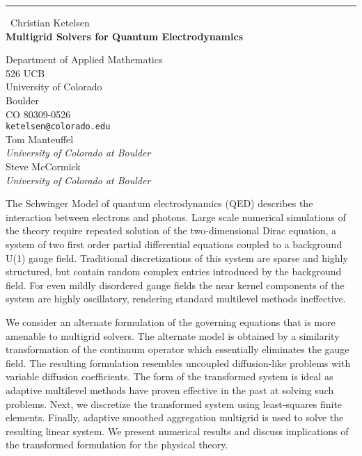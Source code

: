 \documentclass{report}
\begin{document}
\begin{center}
\rule{6in}{1pt} \
{\large Christian Ketelsen \\
{\bf Multigrid Solvers for Quantum Electrodynamics}}

Department of Applied Mathematics \\ 526 UCB \\ University of Colorado \\ Boulder \\ CO 80309-0526
\\
{\tt ketelsen@colorado.edu}\\
Tom Manteuffel \\
{\em University of Colorado at Boulder}\\
Steve McCormick\\
{\em University of Colorado at Boulder}\end{center}

The Schwinger Model of quantum electrodynamics (QED) describes the
interaction between electrons and photons. Large scale numerical
simulations of the theory require repeated solution of the
two-dimensional Dirac equation, a system of two first order partial
differential equations coupled to a background U(1) gauge field.
Traditional discretizations of this system are sparse and highly
structured, but contain random complex entries introduced by the
background field. For even mildly disordered gauge fields the near kernel
components of the system are highly oscillatory, rendering standard
multilevel methods ineffective.

We consider an alternate formulation of the governing equations that is
more amenable to multigrid solvers. The alternate model is obtained by a
similarity transformation of the continuum operator which essentially
eliminates the gauge field. The resulting formulation resembles uncoupled
diffusion-like problems with variable diffusion coefficients. The form of
the transformed system is ideal as adaptive multilevel methods have
proven effective in the past at solving such problems. Next, we
discretize the transformed system using least-squares finite elements.
Finally, adaptive smoothed aggregation multigrid is used to solve the
resulting linear system. We present numerical results and discuss
implications of the transformed formulation for the physical theory.
\end{document}
